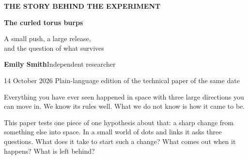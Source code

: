 \documentclass[11pt,letterpaper]{article}
\begin{document}
\thispagestyle{empty}
{\color{accent}\small\textbf{THE STORY BEHIND THE EXPERIMENT}}\par
\vspace{1em}
{\color{ink}\fontsize{29}{33}\selectfont\bfseries The curled torus burps}\par
\vspace{0.5em}
{\raggedright\Large A small push, a large release,\\and the question of what survives\par}
\vspace{0.7em}
\textbf{Emily Smith}\quad Independent researcher\par
14 October 2026 \enspace\textbullet\enspace Plain-language edition of the technical paper of the same date~\cite{tech}
\vspace{0.9em}

Everything you have ever seen happened in space with three large directions you can move in. We know its
rules well. What we do not know is how it came to be.

This paper tests one piece of one hypothesis about that: a sharp change from something else into
space. In a small world of dots and links it asks three questions. What does it take to start such a
change? What comes out when it happens? What is left behind?
\end{document}
